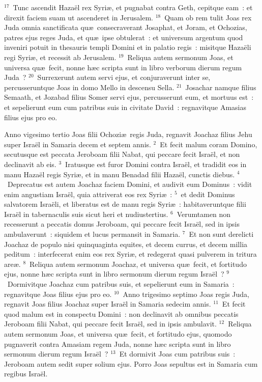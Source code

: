 ${}^{17}$~Tunc ascendit Haza\"el rex Syri\ae , et pugnabat contra Geth, cepitque eam~: et direxit faciem suam ut ascenderet in Jerusalem.
${}^{18}$~Quam ob rem tulit Joas rex Juda omnia sanctificata qu\ae\ consecraverant Josaphat, et Joram, et Ochozias, patres ejus reges Juda, et qu\ae\ ipse obtulerat~: et universum argentum quod inveniri potuit in thesauris templi Domini et in palatio regis~: misitque Haza\"eli regi Syri\ae , et recessit ab Jerusalem.
${}^{19}$~Reliqua autem sermonum Joas, et universa qu\ae\ fecit, nonne h\ae c scripta sunt in libro verborum dierum regum Juda~?
${}^{20}$~Surrexerunt autem servi ejus, et conjuraverunt inter se, percusseruntque Joas in domo Mello in descensu Sella.
${}^{21}$~Josachar namque filius Semaath, et Jozabad filius Somer servi ejus, percusserunt eum, et mortuus est~: et sepelierunt eum cum patribus suis in civitate David~: regnavitque Amasias filius ejus pro eo.

\lettrine[lines=10,image=true,loversize=0.05,lraise=-0.03]{A}{}nno vigesimo tertio Joas filii Ochozi\ae\ regis Juda, regnavit Joachaz filius Jehu super Isra\"el in Samaria decem et septem annis.
${}^{2}$~Et fecit malum coram Domino, secutusque est peccata Jeroboam filii Nabat, qui peccare fecit Isra\"el, et non declinavit ab eis.
${}^{3}$~Iratusque est furor Domini contra Isra\"el, et tradidit eos in manu Haza\"el regis Syri\ae , et in manu Benadad filii Haza\"el, cunctis diebus.
${}^{4}$~Deprecatus est autem Joachaz faciem Domini, et audivit eum Dominus~: vidit enim angustiam Isra\"el, quia attriverat eos rex Syri\ae~:
${}^{5}$~et dedit Dominus salvatorem Isra\"eli, et liberatus est de manu regis Syri\ae~: habitaveruntque filii Isra\"el in tabernaculis suis sicut heri et nudiustertius.
${}^{6}$~Verumtamen non recesserunt a peccatis domus Jeroboam, qui peccare fecit Isra\"el, sed in ipsis ambulaverunt~: siquidem et lucus permansit in Samaria.
${}^{7}$~Et non sunt derelicti Joachaz de populo nisi quinquaginta equites, et decem currus, et decem millia peditum~: interfecerat enim eos rex Syri\ae , et redegerat quasi pulverem in tritura are\ae .
${}^{8}$~Reliqua autem sermonum Joachaz, et universa qu\ae\ fecit, et fortitudo ejus, nonne h\ae c scripta sunt in libro sermonum dierum regum Isra\"el~?
${}^{9}$~Dormivitque Joachaz cum patribus suis, et sepelierunt eum in Samaria~: regnavitque Joas filius ejus pro eo.
${}^{10}$~Anno trigesimo septimo Joas regis Juda, regnavit Joas filius Joachaz super Isra\"el in Samaria sedecim annis.
${}^{11}$~Et fecit quod malum est in conspectu Domini~: non declinavit ab omnibus peccatis Jeroboam filii Nabat, qui peccare fecit Isra\"el, sed in ipsis ambulavit.
${}^{12}$~Reliqua autem sermonum Joas, et universa qu\ae\ fecit, et fortitudo ejus, quomodo pugnaverit contra Amasiam regem Juda, nonne h\ae c scripta sunt in libro sermonum dierum regum Isra\"el~?
${}^{13}$~Et dormivit Joas cum patribus suis~: Jeroboam autem sedit super solium ejus. Porro Joas sepultus est in Samaria cum regibus Isra\"el.


